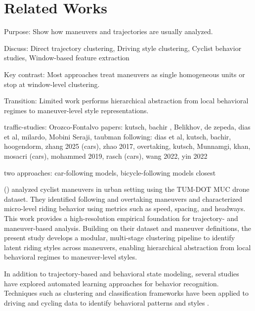 \chapter{Related Works}

\iffalse
Purpose: Show how maneuvers and trajectories are usually analyzed.

Discuss: Direct trajectory clustering, Driving style clustering, Cyclist behavior studies, Window-based feature extraction

Key contrast: Most approaches treat maneuvers as single homogeneous units or stop at window-level clustering.

Transition: Limited work performs hierarchical abstraction from local behavioral regimes to maneuver-level style representations.

traffic-studies: Orozco-Fontalvo
papers: kutsch, bachir , Belikhov, de zepeda, dias et al, milardo, Mobini Seraji, taubman
following: dias et al, kutsch, bachir, hoogendorm, zhang 2025 (cars), zhao 2017, 
overtaking, kutsch, Munnamgi, khan, mosacri (cars), mohammed 2019, rasch (cars), wang 2022, yin 2022

two approaches: car-following models, bicycle-following models 
closest





\citeauthor{kutsch_analyzing_2025} (\citeyear{kutsch_analyzing_2025}) analyzed cyclist maneuvers in urban setting using the TUM-DOT MUC drone dataset. They identified following and overtaking maneuvers and characterized micro-level riding behavior using metrics such as speed, spacing, and headways. This work provides a high-resolution empirical foundation for trajectory- and maneuver-based analysis. Building on their dataset and maneuver definitions, the present study develops a modular, multi-stage clustering pipeline to identify latent riding styles across maneuvers, enabling hierarchical abstraction from local behavioral regimes to maneuver-level styles.

In addition to trajectory-based and behavioral state modeling, several studies have explored automated learning approaches for behavior recognition. Techniques such as clustering and classification frameworks have been applied to driving and cycling data to identify behavioral patterns and styles \cite{mobini_seraji_state---art_2025}.

